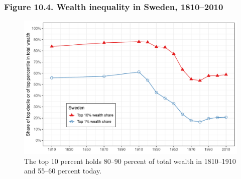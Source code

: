 \documentclass[t]{beamer}\usepackage[]{graphicx}\usepackage[]{color}
\newenvironment{knitrout}{}{} %
\begin{document}
\begin{frame}[label=Figure_10_4]
\frametitle{Figure 10.4. Wealth inequality in Sweden, 1810--2010}
\begin{figure}[t]
\begin{minipage}[b]{\textwidth}
\centering
\begin{knitrout}\footnotesize
{}\color{fgcolor}

{\centering \includegraphics[width=1\linewidth]{figures/color/Figure_10_4} 

}



\end{knitrout}
\caption{The top 10 percent holds 80--90 percent of total wealth in 1810--1910 and 55--60 percent today.}
\end{minipage}
\end{figure}
\end{frame}
\end{document}
